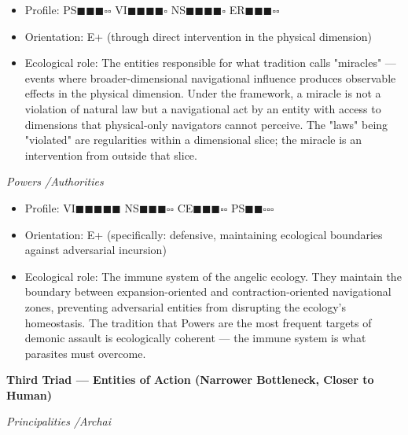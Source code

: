 \begin{itemize}[nosep,leftmargin=*]
  \item Profile: PS$\blacksquare$$\blacksquare$$\blacksquare$$\square$$\square$ VI$\blacksquare$$\blacksquare$$\blacksquare$$\blacksquare$$\square$ NS$\blacksquare$$\blacksquare$$\blacksquare$$\blacksquare$$\square$ ER$\blacksquare$$\blacksquare$$\blacksquare$$\square$$\square$
  \item Orientation: E+ (through direct intervention in the physical dimension)
  \item Ecological role: The entities responsible for what tradition calls "miracles" — events where broader-dimensional navigational influence produces observable effects in the physical dimension. Under the framework, a miracle is not a violation of natural law but a navigational act by an entity with access to dimensions that physical-only navigators cannot perceive. The "laws" being "violated" are regularities within a dimensional slice; the miracle is an intervention from outside that slice.
\end{itemize}


\textit{Powers /\allowbreak  Authorities}

\begin{itemize}[nosep,leftmargin=*]
  \item Profile: VI$\blacksquare$$\blacksquare$$\blacksquare$$\blacksquare$$\blacksquare$ NS$\blacksquare$$\blacksquare$$\blacksquare$$\square$$\square$ CE$\blacksquare$$\blacksquare$$\blacksquare$$\square$$\square$ PS$\blacksquare$$\blacksquare$$\square$$\square$$\square$
  \item Orientation: E+ (specifically: defensive, maintaining ecological boundaries against adversarial incursion)
  \item Ecological role: The immune system of the angelic ecology. They maintain the boundary between expansion-oriented and contraction-oriented navigational zones, preventing adversarial entities from disrupting the ecology's homeostasis. The tradition that Powers are the most frequent targets of demonic assault is ecologically coherent — the immune system is what parasites must overcome.
\end{itemize}


\textbf{Third Triad — Entities of Action (Narrower Bottleneck, Closer to Human)}


\textit{Principalities /\allowbreak  Archai}

